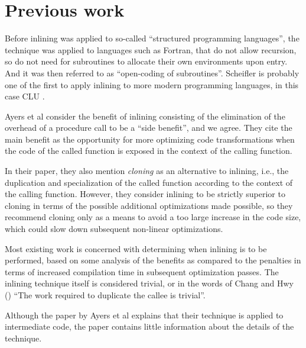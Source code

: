 \section{Previous work}

Before inlining was applied to so-called ``structured programming
languages'', the technique was applied to languages such as Fortran,
that do not allow recursion, so do not need for subroutines to
allocate their own environments upon entry.  And it was then referred
to as ``open-coding of subroutines''.  Scheifler
\cite{Scheifler:1977:AIS:359810.359830} is probably one of the first
to apply inlining to more modern programming languages, in this case
CLU \cite{Liskov:1977:AMC:359763.359789}.

Ayers et al \cite{Ayers:1997:AI:258915.258928} consider the benefit of
inlining consisting of the elimination of the overhead of a procedure
call to be a ``side benefit'', and we agree.  They cite the main
benefit as the opportunity for more optimizing code transformations
when the code of the called function is exposed in the context of the
calling function.

In their paper, they also mention \emph{cloning} as an alternative to
inlining, i.e., the duplication and specialization of the called
function according to the context of the calling function.  However,
they consider inlining to be strictly superior to cloning in terms of
the possible additional optimizations made possible, so they recommend
cloning only as a means to avoid a too large increase in the code
size, which could slow down subsequent non-linear optimizations.

Most existing work is concerned with determining when inlining is to
be performed, based on some analysis of the benefits as compared to
the penalties in terms of increased compilation time in subsequent
optimization passes.  The inlining technique itself is considered
trivial, or in the words of Chang and Hwy
(\cite{Chang:1989:IFE:73141.74840.1, Chang:1989:IFE:74818.74840.2}) ``The
work required to duplicate the callee is trivial''.

Although the paper by Ayers et al explains that their technique is
applied to intermediate code, the paper contains little information
about the details of the technique.

